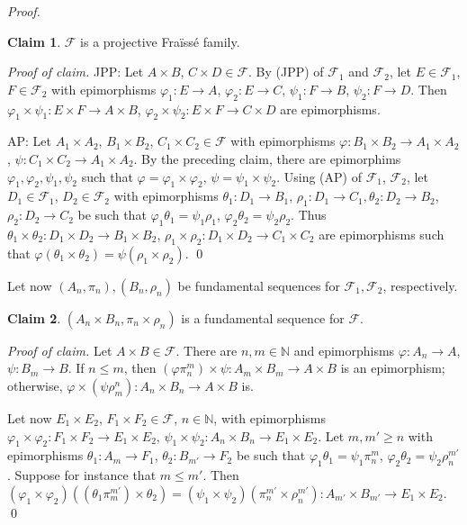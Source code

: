 \documentclass[12pt,twoside,a4paper]{amsart}
\theoremstyle{plain}
\theoremstyle{definition}
\newtheorem{claim}{Claim}[theorem]
\begin{document}
\begin{proof}
\begin{claim}
$ \mathcal F $ is a projective Fra\"iss\'e family.
\end{claim}

{\it Proof of claim.}
JPP:
Let $A\times B$, $C\times D\in \mathcal F $.
By (JPP) of $ \mathcal F_1$ and $ \mathcal F_2$, let $E\in \mathcal F_1$, $F\in \mathcal F_2$ with epimorphisms $ {\varphi}_1:E\to A$, $ {\varphi}_2:E\to C$, $\psi_1:F\to B$, $\psi_2:F\to D$.
Then $ {\varphi}_1\times\psi_1:E\times F\to A\times B$, $ {\varphi}_2\times\psi_2:E\times F\to C\times D$ are epimorphisms.

AP:
Let $A_1\times A_2$, $B_1\times B_2$, $C_1\times C_2\in \mathcal F $ with epimorphisms $ {\varphi} :B_1\times B_2\to A_1\times A_2$, $\psi :C_1\times C_2\to A_1\times A_2$.
By the preceding claim, there are epimorphims $ {\varphi}_1, {\varphi}_2,\psi_1,\psi_2$ such that $ {\varphi} = {\varphi}_1\times {\varphi}_2$, $\psi =\psi_1\times\psi_2$.
Using (AP) of $ \mathcal F_1$, $ \mathcal F_2$, let $D_1\in \mathcal F_1$, $D_2\in \mathcal F_2$ with epimorphisms $\theta_1:D_1\to B_1$, $\rho_1:D_1\to C_1,\theta_2:D_2\to B_2$, $\rho_2:D_2\to C_2$ be such that $ {\varphi}_1\theta_1=\psi_1\rho_1$, $ {\varphi}_2\theta_2=\psi_2\rho_2$.
Thus $\theta_1\times\theta_2:D_1\times D_2\to B_1\times B_2$, $\rho_1\times\rho_2:D_1\times D_2\to C_1\times C_2$ are epimorphisms such that $ {\varphi} (\theta_1\times\theta_2)=\psi (\rho_1\times\rho_2)$.
\qed

\medskip
Let now $(A_n,\pi_n ),(B_n,\rho_n)$ be fundamental sequences for $ \mathcal F_1, \mathcal F_2$, respectively.

\begin{claim}
$(A_n\times B_n,\pi_n\times\rho_n)$ is a fundamental sequence for $ \mathcal F $.
\end{claim}

{\it Proof of claim.}
Let $A\times B\in \mathcal F $.
There are $n,m\in {\mathbb N} $ and epimorphisms $ {\varphi}:A_n\to A$, $\psi :B_m\to B$.
If $n\leq m$, then $( {\varphi}\pi_n^m)\times\psi :A_m\times B_m\to A\times B$ is an epimorphism; otherwise, $ {\varphi} \times (\psi\rho_m^n):A_n\times B_n\to A\times B$ is.

Let now $E_1\times E_2$, $F_1\times F_2\in \mathcal F $, $n\in {\mathbb N} $, with epimorphisms $ {\varphi}_1\times {\varphi}_2:F_1\times F_2\to E_1\times E_2$, $\psi_1\times\psi_2:A_n\times B_n\to E_1\times E_2$.
Let $m,m'\geq n$ with epimorphisms $\theta_1:A_m\to F_1$, $\theta_2:B_{m'}\to F_2$ be such that $ {\varphi}_1\theta_1=\psi_1\pi_n^m$, $ {\varphi}_2\theta_2=\psi_2\rho_n^{m'}$.
Suppose for instance that $m\leq m'$.
Then $( {\varphi}_1\times {\varphi}_2)((\theta_1\pi_m^{m'})\times\theta_2)=(\psi_1\times\psi_2)(\pi_n^{m'}\times\rho_n^{m'}):A_{m'}\times B_{m'}\to E_1\times E_2$.
\qed


\end{proof}
\end{document}
